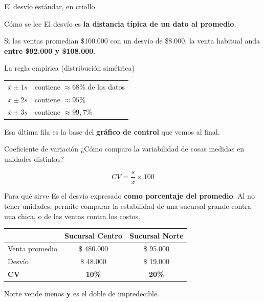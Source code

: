 \documentclass[aspectratio=169,10pt]{beamer}
\begin{document}
\begin{frame}{El desvío estándar, en criollo}
  \begin{block}{Cómo se lee}
    El desvío es \textbf{la distancia típica de un dato al promedio}.

    Si las ventas promedian \$100.000 con un desvío de \$8.000, la venta habitual anda
    \textbf{entre \$92.000 y \$108.000}.
  \end{block}

  \vspace{0.4em}
  \begin{exampleblock}{La regla empírica (distribución simétrica)}
    \begin{center}
    \begin{tabular}{ll}
      $\bar{x} \pm 1s$ & contiene $\approx 68\%$ de los datos \\
      $\bar{x} \pm 2s$ & contiene $\approx 95\%$ \\
      $\bar{x} \pm 3s$ & contiene $\approx 99{,}7\%$ \\
    \end{tabular}
    \end{center}
  \end{exampleblock}
  \begin{center}
  \small Esa última fila es la base del \textbf{gráfico de control} que vemos al final.
  \end{center}
\end{frame}

\begin{frame}{Coeficiente de variación}
  ¿Cómo comparo la variabilidad de cosas medidas en unidades distintas?

  \[ CV = \frac{s}{\bar{x}} \times 100 \]

  \begin{block}{Para qué sirve}
    Es el desvío expresado \textbf{como porcentaje del promedio}. Al no tener unidades, permite
    comparar la estabilidad de una sucursal grande contra una chica, o de las ventas contra los costos.
  \end{block}

  \vspace{0.3em}
  \begin{center}
  \begin{tabular}{lcc}
    \toprule
    & \textbf{Sucursal Centro} & \textbf{Sucursal Norte} \\
    \midrule
    Venta promedio  & \$ 480.000 & \$ 95.000 \\
    Desvío          & \$  48.000 & \$ 19.000 \\
    \textbf{CV}     & \textbf{10\%} & \textbf{20\%} \\
    \bottomrule
  \end{tabular}
  \end{center}
  \vspace{0.3em}
  \begin{center}\small Norte vende menos \textbf{y} es el doble de impredecible.\end{center}
\end{frame}
\end{document}
